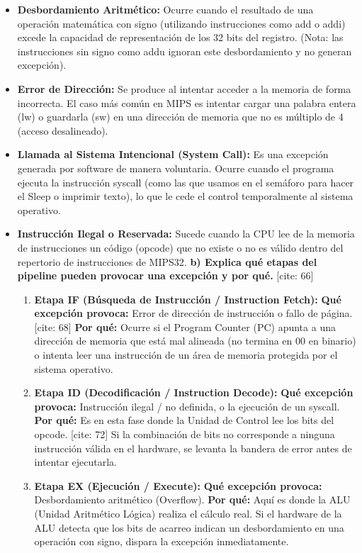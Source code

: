 \documentclass[12pt]{article}
\begin{document}
\begin{itemize}
    \item \textbf{Desbordamiento Aritmético:} Ocurre cuando el resultado de una operación matemática con signo (utilizando instrucciones como add o addi) excede la capacidad de representación de los 32 bits del registro. (Nota: las instrucciones sin signo como addu ignoran este desbordamiento y no generan excepción). 
    \item \textbf{Error de Dirección:} Se produce al intentar acceder a la memoria de forma incorrecta.  El caso más común en MIPS es intentar cargar una palabra entera (lw) o guardarla (sw) en una dirección de memoria que no es múltiplo de 4 (acceso desalineado). 
    \item \textbf{Llamada al Sistema Intencional (System Call):} Es una excepción generada por software de manera voluntaria. Ocurre cuando el programa ejecuta la instrucción syscall (como las que usamos en el semáforo para hacer el Sleep o imprimir texto), lo que le cede el control temporalmente al sistema operativo. 
    \item \textbf{Instrucción Ilegal o Reservada:} Sucede cuando la CPU lee de la memoria de instrucciones un código (opcode) que no existe o no es válido dentro del repertorio de instrucciones de MIPS32. 
\textbf{b) Explica qué etapas del pipeline pueden provocar una excepción y por qué.} [cite: 66]

\begin{enumerate}
    \item \textbf{Etapa IF (Búsqueda de Instrucción / Instruction Fetch):} 
    \textbf{Qué excepción provoca:} Error de dirección de instrucción o fallo de página. [cite: 68]
    \textbf{Por qué:} Ocurre si el Program Counter (PC) apunta a una dirección de memoria que está mal alineada (no termina en 00 en binario) o intenta leer una instrucción de un área de memoria protegida por el sistema operativo. 
    
    \item \textbf{Etapa ID (Decodificación / Instruction Decode):} 
    \textbf{Qué excepción provoca:} Instrucción ilegal / no definida, o la ejecución de un syscall. 
    \textbf{Por qué:} Es en esta fase donde la Unidad de Control lee los bits del opcode. [cite: 72] Si la combinación de bits no corresponde a ninguna instrucción válida en el hardware, se levanta la bandera de error antes de intentar ejecutarla. 
    
    \item \textbf{Etapa EX (Ejecución / Execute):} 
    \textbf{Qué excepción provoca:} Desbordamiento aritmético (Overflow). 
    \textbf{Por qué:} Aquí es donde la ALU (Unidad Aritmético Lógica) realiza el cálculo real.  Si el hardware de la ALU detecta que los bits de acarreo indican un desbordamiento en una operación con signo, dispara la excepción inmediatamente. 
    

\end{enumerate}
\end{itemize}
\end{document}
